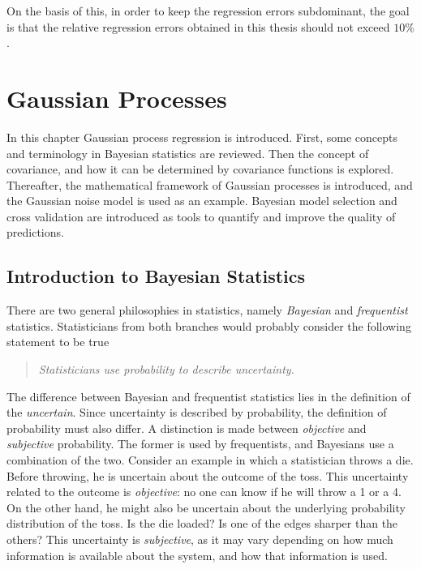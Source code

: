 \documentclass[twoside,english]{uiofysmaster}
\makeatletter
\newenvironment{chapquote}[2][2em]
  {\setlength{\@tempdima}{#1}%
   \def\chapquote@author{#2}%
   \parshape 1 \@tempdima \dimexpr\textwidth-2\@tempdima\relax%
   \itshape}
  {\par\normalfont\hfill--\ \chapquote@author\hspace*{\@tempdima}\par\bigskip}
\makeatother
\begin{document}
{{On the basis of this, in order to keep the regression errors subdominant, the goal is that the relative regression errors obtained in this thesis should not exceed $10 \%$.







\chapter{Gaussian Processes}\label{Chapter:Gaussian Processes}



In this chapter Gaussian process regression is introduced. First, some concepts and terminology in Bayesian statistics are reviewed. Then the concept of covariance, and how it can be determined by covariance functions is explored. Thereafter, the mathematical framework of Gaussian processes is introduced, and the Gaussian noise model is used as an example. Bayesian model selection and cross validation are introduced as tools to quantify and improve the quality of predictions.

\section{Introduction to Bayesian Statistics}

There are two general philosophies in statistics, namely \textit{Bayesian} and \textit{frequentist} statistics. Statisticians from both branches would probably consider the following statement to be true
\begin{quote}
\textit{Statisticians use probability to describe uncertainty.}
\end{quote}
The difference between Bayesian and frequentist statistics lies in the definition of the \textit{uncertain}. Since uncertainty is described by probability, the definition of probability must also differ. A distinction is made between \textit{objective} and \textit{subjective} probability. The former is used by frequentists, and Bayesians use a combination of the two. Consider an example in which a statistician throws a die. Before throwing, he is uncertain about the outcome of the toss. This uncertainty related to the outcome is \textit{objective}: no one can know if he will throw a 1 or a 4. On the other hand, he might also be uncertain about the underlying probability distribution of the toss. Is the die loaded? Is one of the edges sharper than the others? This uncertainty is \textit{subjective}, as it may vary depending on how much information is available about the system, and how that information is used. 

}}
\end{document}
